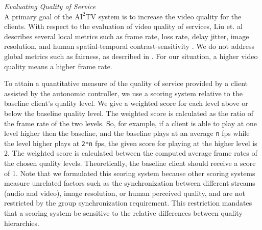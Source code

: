 \documentclass{sig-alternate}
\begin{document}



\textit{Evaluating Quality of Service} \\ A primary goal of the
$\mathrm{AI}^2$TV system is to increase the video quality for the
clients.  With respect to the evaluation of video quality of services,
Liu et. al describes several local metrics such as frame rate, loss
rate, delay jitter, image resolution, and human spatial-temporal
contrast-sensitivity \cite{LIU}.  We do not address global metrics
such as fairness, as described in \cite{LIU}.  For our situation, a
higher video quality means a higher frame rate.

To attain a quantitative measure of the quality of service provided by
a client assisted by the autonomic controller, we use a scoring system
relative to the baseline client's quality level.  We give a weighted
score for each level above or below the baseline quality level.  The
weighted score is calculated as the ratio of the frame rate of the two
levels.  So, for example, if a client is able to play at one level
higher then the baseline, and the baseline plays at an average
\texttt{n} fps while the level higher plays at \texttt{2*n} fps, the
given score for playing at the higher level is 2.  The weighted score
is calculated between the computed average frame rates of the chosen
quality levels.  Theoretically, the baseline client should receive a
score of 1.  Note that we formulated this scoring system because other
scoring systems \cite{BAQAI,CORTE,CONWAY2000} measure unrelated
factors such as the synchronization between different streams (audio
and video), image resolution, or human perceived quality, and are not
restricted by the group synchronization requirement.  This restriction
mandates that a scoring system be sensitive to the relative
differences between quality hierarchies.
\end{document}
